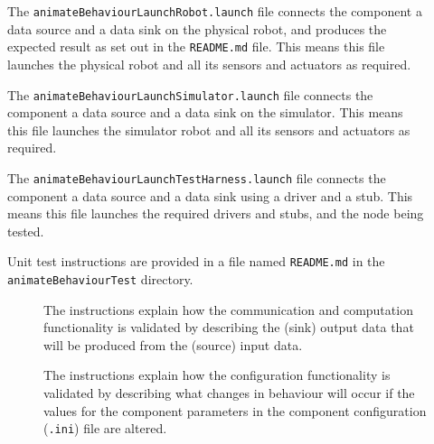 \documentclass{CSSRforAfrica}
\newcommand{\checkboxChecked}{\fbox{\ding{51}}} %
\newcommand{\checkboxDashed}{\fbox{--}}         %
\begin{document}
\begin{description}
\item[\checkboxChecked] The {\small \verb+animateBehaviourLaunchRobot.launch+} file  connects the component a data source and a data sink on the physical robot, and produces the expected result as set out in the  {\small \verb+README.md+}  file.    This means this file launches the physical robot and all its sensors and actuators as required.

\item[\checkboxDashed] The {\small \verb+animateBehaviourLaunchSimulator.launch+} file  connects the component a data source and a data sink on the simulator.   This means this file launches the simulator robot and all its sensors and actuators as required.

\item[\checkboxChecked] The {\small \verb+animateBehaviourLaunchTestHarness.launch+} file  connects the component a data source and a data sink using a driver and a stub.   This means this file launches the required drivers and stubs, and the node being tested.

\item[\checkboxChecked] Unit test instructions are provided in a file named {\small \verb+README.md+} in the  {\small \verb+animateBehaviourTest+} directory. 


\begin{description}

\item[\checkboxChecked] The instructions explain how the communication and computation functionality is validated by describing the (sink) output data that will be produced from the (source) input data.  

\item[\checkboxChecked] The instructions explain how the configuration functionality is validated by describing what changes in behaviour will occur if the values for the component parameters in the component configuration ({\small \verb+.ini+}) file are altered.

\end{description}

\end{description} 

  
%  
%
\end{document}
